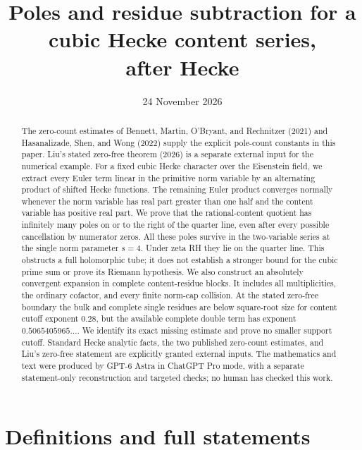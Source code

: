 \documentclass[11pt]{article}
\title{Poles and residue subtraction for a cubic Hecke content series,\\after Hecke}
\author{}
\date{24 November 2026}
\numberwithin{equation}{section}
\begin{document}
\maketitle
\begin{abstract}
The zero-count estimates of Bennett, Martin, O'Bryant, and Rechnitzer
(2021) and Hasanalizade, Shen, and Wong (2022) supply the explicit
pole-count constants in this paper. Liu's stated zero-free theorem (2026) is a separate external input for the numerical example. For a fixed cubic Hecke character over the
Eisenstein field, we extract every Euler term linear in the primitive
norm variable by an alternating product of shifted Hecke functions.
The remaining Euler product converges normally whenever the norm
variable has real part greater than one half and the content variable
has positive real part. We prove that the rational-content quotient
has infinitely many poles on or to the right of the quarter line,
even after every possible cancellation by numerator zeros. All these
poles survive in the two-variable series at the single norm parameter
$s=4$. Under zeta RH they lie on the quarter line. This obstructs a
full holomorphic tube; it does not establish a stronger bound for
the cubic prime sum or prove its Riemann hypothesis.
We also construct an absolutely convergent expansion in complete content-residue blocks. It includes all multiplicities, the ordinary cofactor, and every finite norm-cap collision. At the stated zero-free boundary the bulk and complete single residues are below square-root size for content cutoff exponent \(0.28\), but the available complete double term has exponent \(0.5065405965\ldots\). We identify its exact missing estimate and prove no smaller support cutoff. Standard Hecke analytic facts, the two published zero-count estimates, and Liu's zero-free statement are explicitly granted external inputs. The mathematics and text
were produced by GPT-6 Astra in ChatGPT Pro mode, with a separate statement-only
reconstruction and targeted checks; no human has checked this work.
\end{abstract}

\section{Definitions and full statements}
\end{document}
